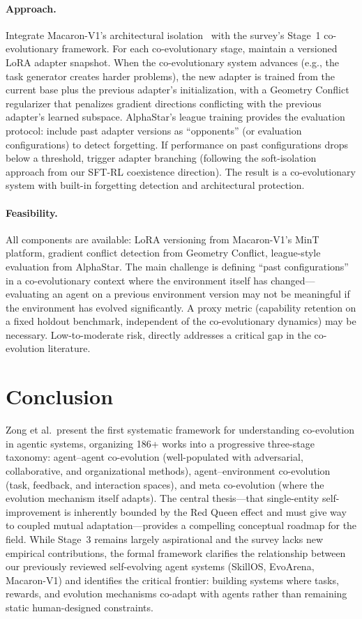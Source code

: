 \documentclass[11pt,a4paper]{article}
\begin{document}
\paragraph{Approach.} Integrate Macaron-V1's architectural isolation~\cite{macaron2026} with the survey's Stage~1 co-evolutionary framework. For each co-evolutionary stage, maintain a versioned LoRA adapter snapshot. When the co-evolutionary system advances (e.g., the task generator creates harder problems), the new adapter is trained from the current base plus the previous adapter's initialization, with a Geometry Conflict~\cite{geoconflict2026} regularizer that penalizes gradient directions conflicting with the previous adapter's learned subspace. AlphaStar's league training provides the evaluation protocol: include past adapter versions as ``opponents'' (or evaluation configurations) to detect forgetting. If performance on past configurations drops below a threshold, trigger adapter branching (following the soft-isolation approach from our SFT-RL coexistence direction). The result is a co-evolutionary system with built-in forgetting detection and architectural protection.

\paragraph{Feasibility.} All components are available: LoRA versioning from Macaron-V1's MinT platform, gradient conflict detection from Geometry Conflict, league-style evaluation from AlphaStar. The main challenge is defining ``past configurations'' in a co-evolutionary context where the environment itself has changed---evaluating an agent on a previous environment version may not be meaningful if the environment has evolved significantly. A proxy metric (capability retention on a fixed holdout benchmark, independent of the co-evolutionary dynamics) may be necessary. Low-to-moderate risk, directly addresses a critical gap in the co-evolution literature.

\section{Conclusion}

Zong et al.\ present the first systematic framework for understanding co-evolution in agentic systems, organizing 186+ works into a progressive three-stage taxonomy: agent--agent co-evolution (well-populated with adversarial, collaborative, and organizational methods), agent--environment co-evolution (task, feedback, and interaction spaces), and meta co-evolution (where the evolution mechanism itself adapts). The central thesis---that single-entity self-improvement is inherently bounded by the Red Queen effect and must give way to coupled mutual adaptation---provides a compelling conceptual roadmap for the field. While Stage~3 remains largely aspirational and the survey lacks new empirical contributions, the formal framework clarifies the relationship between our previously reviewed self-evolving agent systems (SkillOS, EvoArena, Macaron-V1) and identifies the critical frontier: building systems where tasks, rewards, and evolution mechanisms co-adapt with agents rather than remaining static human-designed constraints.
\end{document}
